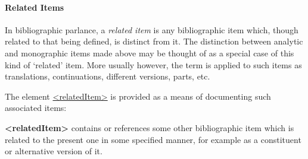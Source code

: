 \paragraph[{Related Items}]{Related Items}\label{COBIRI}\par
In bibliographic parlance, a \textit{related item} is any bibliographic item which, though related to that being defined, is distinct from it. The distinction between analytic and monographic items made above may be thought of as a special case of this kind of ‘related’ item. More usually however, the term is applied to such items as translations, continuations, different versions, parts, etc.\par
The element \hyperref[TEI.relatedItem]{<relatedItem>} is provided as a means of documenting such associated items: 
\begin{sansreflist}
  
\item [\textbf{<relatedItem>}] contains or references some other bibliographic item which is related to the present one in some specified manner, for example as a constituent or alternative version of it.
\end{sansreflist}
\par
